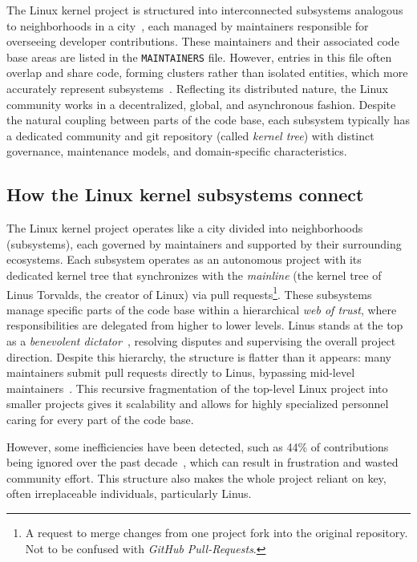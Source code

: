 \documentclass[sigconf]{acmart} %
\begin{document}
The Linux kernel project is structured into interconnected subsystems analogous
to neighborhoods in a city~\cite{wen2021-masterthesis}, each managed by
maintainers responsible for overseeing developer contributions. These
maintainers and their associated code base areas are listed in the
\texttt{MAINTAINERS} file. However, entries in this file often overlap and share
code, forming clusters rather than isolated entities, which more accurately
represent subsystems~\cite{corbet2021-subsystems}. Reflecting its distributed
nature, the Linux community works in a decentralized, global, and asynchronous
fashion. Despite the natural coupling between parts of the code base, each
subsystem typically has a dedicated community and git repository (called
\textit{kernel tree}) with distinct governance, maintenance models, and
domain-specific characteristics.

\subsection{How the Linux kernel subsystems connect}

The Linux kernel project operates like a city divided into neighborhoods
(subsystems), each governed by maintainers and supported by their surrounding
ecosystems. Each subsystem operates as an autonomous project with its dedicated
kernel tree that synchronizes with the \textit{mainline} (the kernel tree of
Linus Torvalds, the creator of Linux) via pull requests\footnote{A request to
merge changes from one project fork into the original repository. Not to be
confused with \textit{GitHub Pull-Requests}.}. These subsystems manage specific
parts of the code base within a hierarchical \textit{web of trust}, where
responsibilities are delegated from higher to lower levels. Linus stands at the
top as a \textit{benevolent dictator}~\cite{corbet2014-4.4}, resolving disputes
and supervising the overall project direction. Despite this hierarchy, the
structure is flatter than it appears: many maintainers submit pull requests
directly to Linus, bypassing mid-level maintainers~\cite{corbet2017-patchflow}.
This recursive fragmentation of the top-level Linux project into smaller
projects gives it scalability and allows for highly specialized personnel caring
for every part of the code base. 

However, some inefficiencies have been detected, such as 44\% of contributions
being ignored over the past decade~\cite{rigby2014-peer-review}, which can
result in frustration and wasted community effort. This structure also makes the
whole project reliant on key, often irreplaceable individuals, particularly
Linus. 
\end{document}
